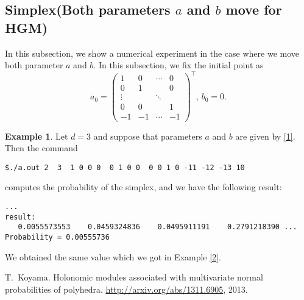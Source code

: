 \documentclass[12pt]{article}
\theoremstyle{definition}
\newtheorem{example}{Example}
\begin{document}
\subsection{Simplex(Both parameters $a$ and $b$ move for HGM)}
In this subsection, we show a numerical experiment in the case where
we move both parameter $a$ and $b$.
In this subsection, we fix the initial point as
$$
a_0 = 
\begin{pmatrix} 
  1 & 0 & \cdots & 0\\
  0 & 1 &        & 0\\
  \vdots & & \ddots & \\
  0 & 0 &        & 1\\
  -1 & -1 & \cdots & -1
\end{pmatrix}^\top
,\,b_0 = 0.
$$
\begin{example}
Let $d=3$ and suppose that parameters $a$ and $b$ are given by \eqref{1}.
Then the command 
\begin{framed}
\begin{verbatim}
$./a.out 2  3  1 0 0 0  0 1 0 0  0 0 1 0 -11 -12 -13 10
\end{verbatim}
\end{framed}
computes the probability of the simplex, and we have the following result:
\begin{framed}
\begin{verbatim}
...
result:
   0.0055573553    0.0459324836    0.0495911191    0.2791218390 ...
Probability = 0.00555736
\end{verbatim}
\end{framed}
We obtained the same value which we got in Example \ref{2}.
\end{example}

\begin{thebibliography}{1}
T.~Koyama.
\newblock Holonomic modules associated with multivariate normal probabilities
  of polyhedra.
\newblock \url{http://arxiv.org/abs/1311.6905}, 2013.
\end{thebibliography}
\end{document}
